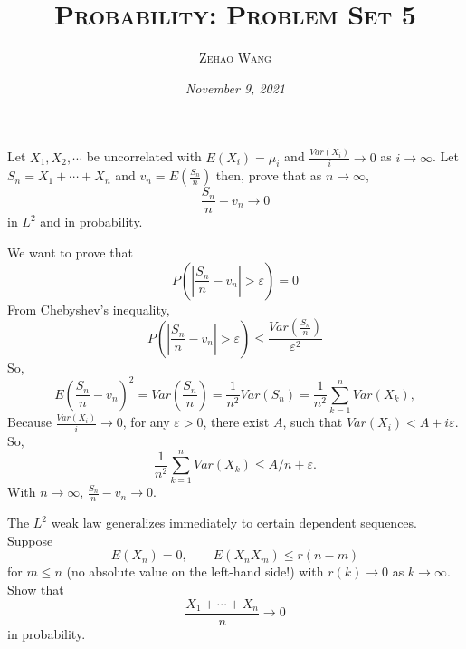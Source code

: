 \documentclass[en, normal, 11pt, black]{elegantnote}
\title{\textsc{Probability: Problem Set 5}}
\author{\textsc{Zehao Wang}}
\date{\emph{November 9, 2021}}
\newenvironment{exercise}[1]{\begin{tcolorbox}[colback=black!15, colframe=black!80, breakable, title=#1]}{\end{tcolorbox}}
\renewenvironment{proof}{\begin{tcolorbox}[colback=white, colframe=black!50, breakable, title=Proof. ]\setlength{\parskip}{0.8em}}{\,\\\rightline{$\square$}\end{tcolorbox}}
\begin{document}
    \maketitle
    \begin{exercise}{2.2.1}
        Let $X_{1}, X_{2}, \cdots$ be uncorrelated with $E (X_{i})=\mu_{i}$ and $\frac{Var\left(X_{i}\right) }{i} \rightarrow 0$ as $i \rightarrow \infty$. Let $S_{n}=X_{1}+\cdots+X_{n}$ and $v_{n}=E\left(\frac{S_n}{n}\right)$ then, prove that as $n \rightarrow \infty$, 
        \[
            \frac{S_{n}}{n}-v_{n} \rightarrow 0
        \]
        in $L^{2}$ and in probability. 
    \end{exercise}

    \begin{proof}
        We want to prove that 
        \[
            P\left(\left|\frac{S_n}{n}-v_n\right|>\varepsilon\right)=0
        \]
        From Chebyshev's inequality, 
        \[
            P\left(\left|\frac{S_n}{n}-v_n\right|>\varepsilon\right)\leqslant\frac{Var(\frac{S_n}{n})}{\varepsilon^2}
        \]
        So, 
        \[
            E\left(\frac{S_n}{n}-v_n\right)^2=Var\left(\frac{S_n}{n}\right)=\frac{1}{n^2}Var(S_n)=\frac{1}{n^2}\sum_{k=1}^nVar(X_k), 
        \]
        Because $\frac{Var(X_i)}{i}\to0$, for any $\varepsilon>0$, there exist $A$, such that $Var(X_i)<A+i\varepsilon$. So, 
        \[
            \frac{1}{n^2}\sum_{k=1}^nVar(X_k)\leqslant A/n+\varepsilon. 
        \]
        With $n\to\infty$, $\frac{S_n}{n}-v_n\to0$. 
    \end{proof}

    \begin{exercise}{2.2.2}
        The $L^{2}$ weak law generalizes immediately to certain dependent sequences. Suppose 
        \[
            E (X_{n})=0, \qquad E (X_{n} X_{m}) \leqslant r(n-m)
        \]
        for $m \leqslant n$ (no absolute value on the left-hand side!) with $r(k) \rightarrow 0$ as $k \rightarrow \infty$. Show that 
        \[
            \frac{X_{1}+\cdots+X_{n}}{ n} \rightarrow 0
        \]
        in probability. 
    \end{exercise}
\end{document}

